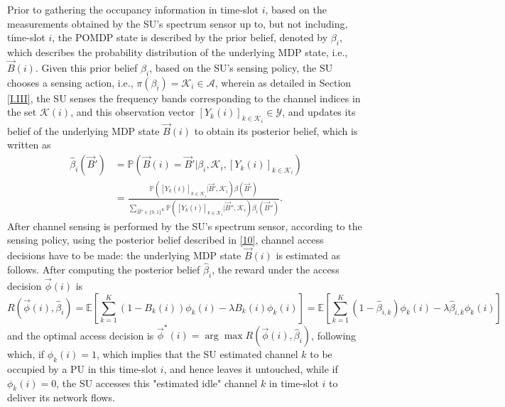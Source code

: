 \documentclass[12pt, draftcls, onecolumn]{IEEEtran}
\begin{document}
Prior to gathering the occupancy information in time-slot $i$, based on the measurements obtained by the SU's spectrum sensor up to, but not including, time-slot $i$, the POMDP state is described by the prior belief, denoted by $\beta_{i}$, which describes the probability distribution of the underlying MDP state, i.e., $\vec{B}(i)$. Given this prior belief $\beta_{i}$, based on the SU's sensing policy, the SU chooses a sensing action, i.e., $\pi(\beta_{i})=\mathcal{K}_{i}{\in}\mathcal{A}$, wherein as detailed in Section \ref{I.III}, the SU senses the frequency bands corresponding to the channel indices in the set $\mathcal{K}(i)$, and this observation vector $[Y_{k}(i)]_{k{\in}\mathcal{K}_{i}}{\in}\mathcal{Y}$, and updates its belief of the underlying MDP state $\vec{B}(i)$ to obtain its posterior belief, which is written as
\begin{equation}\label{10}
    \begin{aligned}
        \hat{\beta}_{i}(\vec{B}')&=\mathbb{P}(\vec{B}(i)=\vec{B}'|\beta_{i},\mathcal{K}_{i},[Y_{k}(i)]_{k{\in}\mathcal{K}_{i}})\\
        &=\frac{\mathbb{P}([Y_{k}(i)]_{k{\in}\mathcal{K}_{i}}|\vec{B}',\mathcal{K}_{i})\beta(\vec{B}')}{\sum_{\vec{B}'' \in \{0,1\}^{K}}\mathbb{P}([Y_{k}(i)]_{k{\in}\mathcal{K}_{i}}|\vec{B}'',\mathcal{K}_{i})\beta_{i}(\vec{B}'')}.
    \end{aligned}
\end{equation}
After channel sensing is performed by the SU's spectrum sensor, according to the sensing policy, using the posterior belief described in \eqref{10}, channel access decisions have to be made: the underlying MDP state $\vec{B}(i)$ is estimated as follows. After computing the posterior belief $\hat{\beta}_{i}$, the reward under the access decision $\vec{\phi}(i)$ is
\begin{equation}\label{12}
    R(\vec{\phi}(i),\hat{\beta}_{i})=
    \mathbb E\left[\sum_{k=1}^{K}(1-B_{k}(i))\phi_{k}(i)-\lambda B_{k}(i)\phi_k(i)\right]
    =
    \mathbb E\left[\sum_{k=1}^{K}(1-\hat{\beta}_{i,k})\phi_{k}(i)-\lambda \hat{\beta}_{i,k}\phi_k(i)\right]
\end{equation}
and the optimal access decision is $\vec{\phi}^{*}(i)=\arg\max R(\vec{\phi}(i),\hat{\beta}_{i})$, following which, if $\phi_{k}(i){=}1$, which implies that the SU estimated channel $k$ to be occupied by a PU in this time-slot $i$, and hence leaves it untouched, while if $\phi_{k}(i){=}0$, the SU accesses this "estimated idle" channel $k$ in time-slot $i$ to deliver its network flows.
\end{document}
